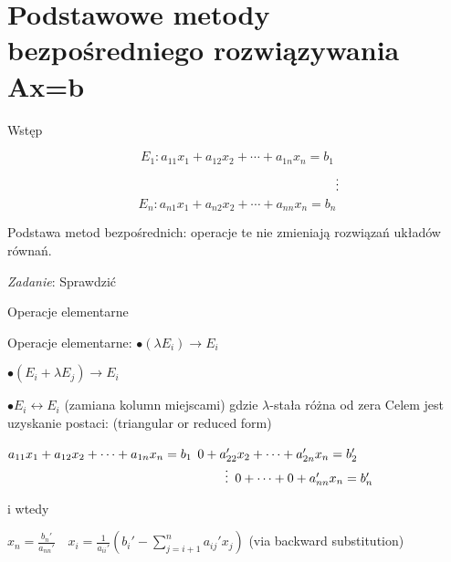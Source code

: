 \section{Podstawowe metody bezpośredniego rozwiązywania Ax=b}
\begin{frame}{Wstęp}
\begin{exampleblock}{}
    $$
E_{1}:a_{11}x_{1}+a_{12}x_{2}+\cdots+a_{1n}x_{n}=b_{1}
$$
$$
\hspace{55.5mm} \vdots
$$
$$
E_{n}:a_{n1}x_{1}+a_{n2}x_{2}+\cdots+a_{nn}x_{n}=b_{n}
$$

 \end{exampleblock}
Podstawa metod bezpośrednich: operacje te nie zmieniają rozwiązań układów równań.
\begin{flushright}
{\it Zadanie}: Sprawdzić
\end{flushright} 
\end{frame}
\begin{frame}{Operacje elementarne}

Operacje elementarne: \newline
$\bullet(\lambda E_{i})\rightarrow E_{i}$

$\bullet(E_{i}+\lambda E_{j})\rightarrow E_{i}$

$\bullet E_{i}\leftrightarrow E_{i}$ (zamiana kolumn miejscami)\newline
gdzie $\lambda$-stała różna od zera \newline
Celem jest uzyskanie postaci: (triangular or reduced form)
\begin{flushright}
$a_{11}x_{1}+a_{12}x_{2}+\cdots+a_{1n}x_{n}=b_{1} \linebreak$
$0+a_{22}'x_{2}+\cdots+a_{2n}'x_{n}=b_{2}'
 \linebreak$
$ \hspace{60mm} \vdots \linebreak$
$0+\cdots+0+a_{nn}'x_{n}=b_{n}' \linebreak$
\end{flushright}
$\mathrm{i}$ wtedy

$ x_{n}=  \frac{b_{n}'}{a_{nn}'}\quad x_{i}= \frac{1}{a_{ii}'}(b_{i}'-\displaystyle \sum_{j=i+1}^{n} a_{ij}'x_{j})$ (via backward substitution)
\end{frame}
